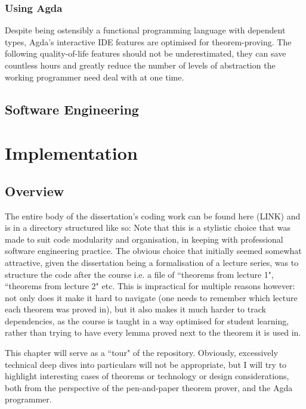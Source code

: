 \documentclass[12pt,a4paper,twoside,openright]{report}
\begin{document}
\subsection{Using Agda}
Despite being ostensibly a functional programming language with dependent types, Agda's interactive IDE features are optimised for theorem-proving. The following quality-of-life features should not be underestimated, they can save countless hours and greatly reduce the number of levels of abstraction the working programmer need deal with at one time. 
\section{Software Engineering}

\chapter{Implementation}
\section{Overview}
The entire body of the dissertation's coding work can be found here (LINK) and is in a directory structured like so:
\vspace{5mm}
Note that this is a stylistic choice that was made to suit code modularity and organisation, in keeping with professional software engineering practice. The obvious choice that initially seemed somewhat attractive, given the dissertation being a formalisation of a lecture series, was to structure the code after the course i.e. a file of ``theorems from lecture 1", ``theorems from lecture 2" etc. This is impractical for multiple reasons however: not only does it make it hard to navigate (one needs to remember which lecture each theorem was proved in), but it also makes it much harder to track dependencies, as the course is taught in a way optimised for student learning, rather than trying to have every lemma proved next to the theorem it is used in. 

This chapter will serve as a ``tour" of the repository. Obviously, excessively technical deep dives into particulars will not be appropriate, but I will try to highlight interesting cases of theorems or technology or design considerations, both from the perspective of the pen-and-paper theorem prover, and the Agda programmer. 
\end{document}
